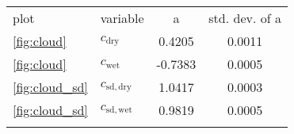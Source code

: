 \begin{tabular}{llcc}
\tophline
               plot &                         variable &       a & std. dev. of a \\
\middlehline
 \ref{fig:cloud} &  $c_{\mathrm{dry}}$ & 0.4205 & 0.0011 \\
 \ref{fig:cloud} &  $c_{\mathrm{wet}}$ & -0.7383 & 0.0005 \\
 \ref{fig:cloud_sd} &  $c_{\mathrm{sd}, \mathrm{dry}}$ & 1.0417 & 0.0003 \\
 \ref{fig:cloud_sd} &  $c_{\mathrm{sd}, \mathrm{wet}}$ & 0.9819 & 0.0005 \\
\bottomhline
\end{tabular}

